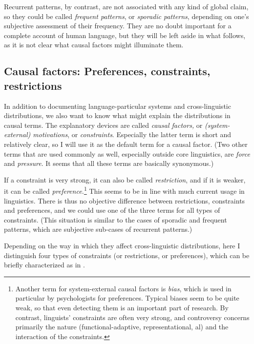 \documentclass[output=paper]{langsci/langscibook}
\begin{document}
Recurrent patterns, by contrast, are not associated with any kind of global claim, so they could be called \textit{frequent patterns}, or \textit{sporadic patterns}, depending on one’s subjective assessment of their frequency. They are no doubt important for a complete account of human language, but they will be left aside in what follows, as it is not clear what causal factors might illuminate them.

\subsection{Causal factors: Preferences, constraints, restrictions}\label{sec:haspelmath:2.3}


In addition to documenting language-particular systems and cross-linguistic distributions, we also want to know what might explain the distributions in causal terms. The explanatory devices are called \textit{causal factors,} or \textit{(system-external) motivations}, or \textit{constraints}. Especially the latter term is short and relatively clear, so I will use it as the default term for a causal factor. (Two other terms that are used commonly as well, especially outside core linguistics, are \textit{force} and \textit{pressure}. It seems that all these terms are basically synonymous.)

If a constraint is very strong, it can also be called \textit{restriction}, and if it is weaker, it can be called \textit{preference.}\footnote{Another term for system-external causal factors is \textit{bias}, which is used in particular by psychologists for  preferences. Typical biases seem to be quite weak, so that even detecting them is an important part of research. By contrast, linguists’ constraints are often very strong, and controversy concerns primarily the nature (functional-adaptive, representational, al) and the interaction of the constraints.} This seems to be in line with much current usage in linguistics. There is thus no objective difference between restrictions, constraints and preferences, and we could use one of the three terms for all types of constraints. (This situation is similar to the cases of sporadic and frequent patterns, which are subjective sub-cases of recurrent patterns.)

Depending on the way in which they affect cross-linguistic distributions, here I distinguish four types of constraints (or restrictions, or preferences), which can be briefly characterized as in .
\end{document}
